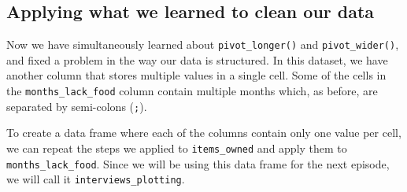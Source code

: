 \documentclass[
]{article}
\begin{document}
\subsection{Applying what we learned to clean our
data}\label{applying-what-we-learned-to-clean-our-data}

Now we have simultaneously learned about \texttt{pivot\_longer()} and
\texttt{pivot\_wider()}, and fixed a problem in the way our data is
structured. In this dataset, we have another column that stores multiple
values in a single cell. Some of the cells in the
\texttt{months\_lack\_food} column contain multiple months which, as
before, are separated by semi-colons (\texttt{;}).

To create a data frame where each of the columns contain only one value
per cell, we can repeat the steps we applied to \texttt{items\_owned}
and apply them to \texttt{months\_lack\_food}. Since we will be using
this data frame for the next episode, we will call it
\texttt{interviews\_plotting}.
\end{document}

